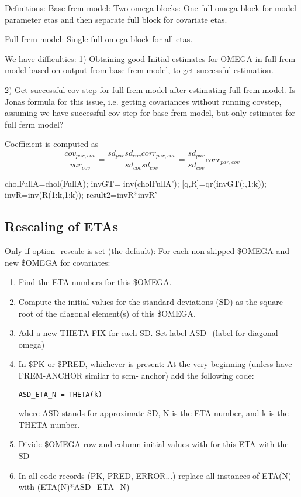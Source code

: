 Definitions:
Base frem model: Two omega blocks: One full omega block for model parameter etas and then separate full block for
covariate etas.

Full frem model: Single full omega block for all etas.

We have difficulties:
1) Obtaining good Initial estimates for OMEGA in full frem model based on output from base frem model,
to get successful estimation.

2) Get successful cov step for full frem model after estimating full frem model.
Is Jonas formula for this issue, i.e. getting covariances without running covstep, assuming we have
successful cov step for base frem model, but only estimates for full ferm model?


Coefficient is computed as
\[
\frac{cov_{par,cov}}{var_{cov}}=\frac{sd_{par}sd_{cov}corr_{par,cov}}{sd_{cov}sd_{cov}}=\frac{sd_{par}}{sd_{cov}}corr_{par,cov}
\]



  cholFullA=chol(FullA);
invGT=  inv(cholFullA'); %
[q,R]=qr(invGT(:,1:k));
invR=inv(R(1:k,1:k));
result2=invR*invR'

\subsection{Rescaling of ETAs}
Only if option -rescale is set (the default):
For each non-skipped \$OMEGA and new \$OMEGA for covariates:
\begin{enumerate}
\item Find the ETA numbers for this \$OMEGA.
\item Compute the initial values for the standard deviations (SD) as the square root of the diagonal
element(s) of this \$OMEGA.
\item Add a new THETA FIX for each SD. Set label ASD\_(label for diagonal omega)
\item In \$PK or \$PRED, whichever is present:
At the very beginning (unless have FREM-ANCHOR similar to scm- anchor) add the following code: \\
\begin{verbatim}
ASD_ETA_N = THETA(k)
\end{verbatim}
where ASD stands for approximate SD, N is the ETA number, and k is the THETA number.
\item Divide \$OMEGA row and column initial values with for this ETA with the SD
\item In all code records (PK, PRED, ERROR...) replace all instances of ETA(N) with (ETA(N)*ASD\_ETA\_N)
\end{enumerate}
